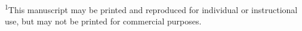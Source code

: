 \textsuperscript{1}This manuscript may be printed and reproduced for individual or instructional use, but may not be printed for commercial purposes.